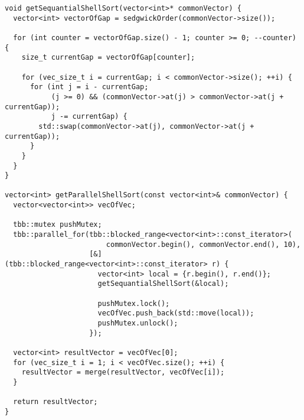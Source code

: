 \documentclass{report}
\begin{document}
\begin{lstlisting}
void getSequantialShellSort(vector<int>* commonVector) {
  vector<int> vectorOfGap = sedgwickOrder(commonVector->size());

  for (int counter = vectorOfGap.size() - 1; counter >= 0; --counter) {
    size_t currentGap = vectorOfGap[counter];

    for (vec_size_t i = currentGap; i < commonVector->size(); ++i) {
      for (int j = i - currentGap;
           (j >= 0) && (commonVector->at(j) > commonVector->at(j + currentGap));
           j -= currentGap) {
        std::swap(commonVector->at(j), commonVector->at(j + currentGap));
      }
    }
  }
}

vector<int> getParallelShellSort(const vector<int>& commonVector) {
  vector<vector<int>> vecOfVec;

  tbb::mutex pushMutex;
  tbb::parallel_for(tbb::blocked_range<vector<int>::const_iterator>(
                        commonVector.begin(), commonVector.end(), 10),
                    [&](tbb::blocked_range<vector<int>::const_iterator> r) {
                      vector<int> local = {r.begin(), r.end()};
                      getSequantialShellSort(&local);

                      pushMutex.lock();
                      vecOfVec.push_back(std::move(local));
                      pushMutex.unlock();
                    });

  vector<int> resultVector = vecOfVec[0];
  for (vec_size_t i = 1; i < vecOfVec.size(); ++i) {
    resultVector = merge(resultVector, vecOfVec[i]);
  }

  return resultVector;
}
\end{lstlisting}
\end{document}
